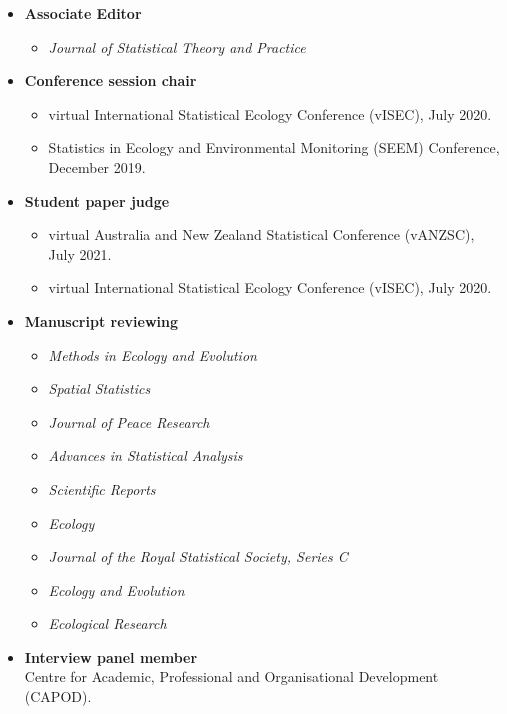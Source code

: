 \documentclass[10pt,a4paper]{moderncv}
\begin{document}
\begin{itemize}
\item \textbf{Associate Editor}
  \begin{itemize}
  \item \textit{Journal of Statistical Theory and Practice}
  \end{itemize}
\item \textbf{Conference session chair}
  \begin{itemize}
  \item virtual International Statistical Ecology Conference (vISEC), July 2020.
  \item Statistics in Ecology and Environmental Monitoring (SEEM) Conference, December 2019.
  \end{itemize}
  \item \textbf{Student paper judge}
    \begin{itemize}
   \item virtual Australia and New Zealand Statistical Conference (vANZSC), July 2021.
  \item virtual International Statistical Ecology Conference (vISEC), July 2020.
  \end{itemize}
\item \textbf{Manuscript reviewing}
  \begin{itemize}
  \item \textit{Methods in Ecology and Evolution}
  \item \textit{Spatial Statistics}
  \item \textit{Journal of Peace Research}
  \item \textit{Advances in Statistical Analysis}
  \item   \textit{Scientific Reports}
  \item \textit{Ecology}
  \item  \textit{Journal of the Royal Statistical Society, Series C}
  \item   \textit{Ecology and Evolution}
  \item   \textit{Ecological Research}
  \end{itemize}
  \item \textbf{Interview panel member}\\
    Centre for Academic, Professional and Organisational Development (CAPOD).
  \end{itemize}
\end{document}
